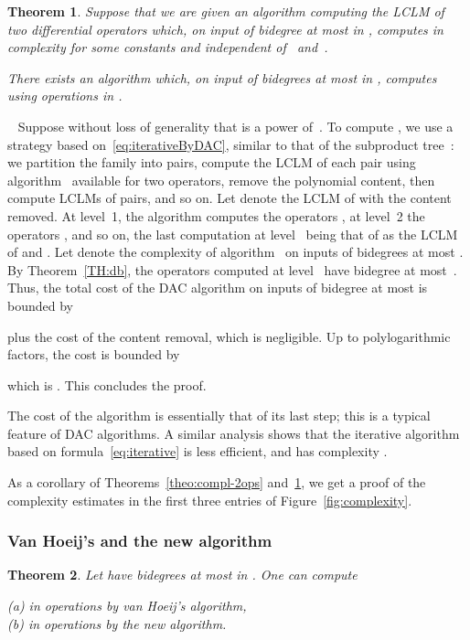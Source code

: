 \documentclass{sig-alt-full}
\def\myproof{\noindent{\sc Proof.}~}
\def\foorp{\hfill}
\newtheorem{theorem}{Theorem}
\begin{document}
\vspace{-0.2cm}

\begin{theorem} \label{theo:DAC}
	Suppose that we are given an algorithm  computing the LCLM
of two differential operators which, on input  of bidegree at most  in , computes 
in complexity  for some constants  and  independent of~ and~. 

There exists an algorithm which, on input  of bidegrees at most  in , computes  using  operations in .
\end{theorem}

\myproof
Suppose without loss of generality that  is a power of~.	
To compute , we  use a strategy based on~\eqref{eq:iterativeByDAC}, similar to that of the subproduct tree~\cite[\S10.1]{GaGe03}: we partition the family  into pairs, compute the LCLM of each pair using algorithm~ available for two operators, remove the polynomial content, then compute LCLMs of pairs, and so on. Let  denote the LCLM of  with the content removed.
At level~1, the algorithm computes the  operators , at level~2 the  operators , and so on, the last computation at level~ being that of  as the LCLM of  and . Let  denote the complexity of algorithm~ on inputs of bidegrees at most .
By Theorem~\ref{TH:db}, the operators computed at level~ have bidegree at most~.
Thus, the total cost of the DAC algorithm on  inputs of bidegree at most  is bounded by

plus the cost of the content removal, which is negligible. 
Up to polylogarithmic factors, the cost is bounded by

which is . This concludes the proof.
\foorp	

The cost of the algorithm is essentially that of its last step; this is a typical feature of DAC
algorithms.
A similar analysis shows that the iterative algorithm based on
formula~\eqref{eq:iterative} is less efficient, and has complexity
.

\smallskip As a corollary of Theorems~\ref{theo:compl-2ops}
and~\ref{theo:DAC}, we get a proof of the complexity estimates in the
first three entries of Figure~\ref{fig:complexity}.

\subsubsection{Van Hoeij's and the new algorithm}
\vspace{-0.3cm}
\begin{theorem}\label{theo:compl-kops}
Let  have bidegrees at most  in .	
One can compute  
\begin{tabbing}
	\quad \emph{(a)} in  operations by van Hoeij's algorithm,	\\
	\quad \emph{(b)} in  operations by the new algorithm. 
\end{tabbing}
\end{theorem}
\end{document}
